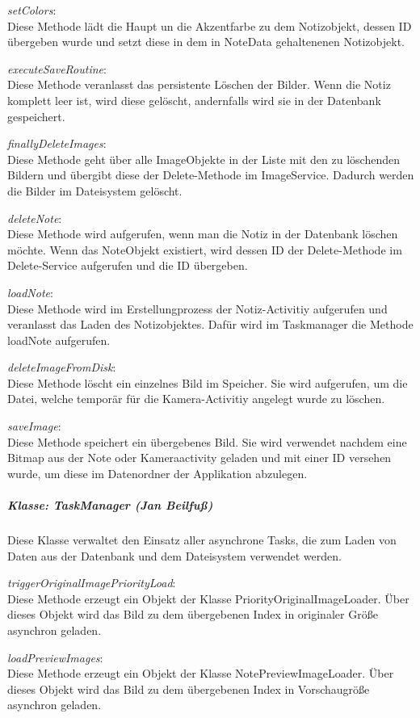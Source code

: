\textit{setColors}:\\
Diese Methode lädt die Haupt un die Akzentfarbe zu dem Notizobjekt, dessen ID übergeben wurde und setzt diese in dem in NoteData gehaltenenen Notizobjekt.

\textit{executeSaveRoutine}:\\
Diese Methode veranlasst das persistente Löschen der Bilder. Wenn die Notiz komplett leer ist, wird diese gelöscht, andernfalls wird sie in der Datenbank gespeichert. 

\textit{finallyDeleteImages}:\\
Diese Methode geht über alle ImageObjekte in der Liste mit den zu löschenden Bildern und übergibt diese der Delete-Methode im ImageService. Dadurch werden die Bilder im Dateisystem gelöscht.

\textit{deleteNote}:\\
Diese Methode wird aufgerufen, wenn man die Notiz in der Datenbank löschen möchte. Wenn das NoteObjekt existiert, wird dessen ID der Delete-Methode im Delete-Service aufgerufen und die ID übergeben.

\textit{loadNote}:\\
Diese Methode wird im Erstellungprozess der Notiz-Activitiy aufgerufen und veranlasst das Laden des Notizobjektes. Dafür wird im Taskmanager die Methode loadNote aufgerufen.

\textit{deleteImageFromDisk}:\\
Diese Methode löscht ein einzelnes Bild im Speicher. Sie wird aufgerufen, um die Datei, welche temporär für die Kamera-Activitiy angelegt wurde zu löschen. 

\textit{saveImage}:\\
 Diese Methode speichert ein übergebenes Bild. Sie wird verwendet nachdem eine Bitmap aus der Note oder Kameraactivity geladen und mit einer ID versehen wurde, um diese im Datenordner der Applikation abzulegen.

\subparagraph{Klasse: TaskManager (Jan Beilfuß)}
Diese Klasse verwaltet den Einsatz aller asynchrone Tasks, die zum Laden von Daten aus der Datenbank und dem Dateisystem verwendet werden. 

\textit{triggerOriginalImagePriorityLoad}:\\
Diese Methode erzeugt ein Objekt der Klasse PriorityOriginalImageLoader. Über dieses Objekt wird das Bild zu dem übergebenen Index in originaler Größe asynchron geladen.

\textit{loadPreviewImages}:\\
Diese Methode erzeugt ein Objekt der Klasse NotePreviewImageLoader. Über dieses Objekt wird das Bild zu dem übergebenen Index in Vorschaugröße asynchron geladen.


